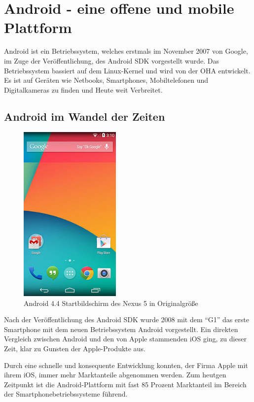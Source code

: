 \section{Android - eine offene und mobile Plattform}
Android ist ein Betriebssystem, welches erstmals im November 2007 von Google, im Zuge der Ver\"offentlichung, des Android \ac{SDK} vorgestellt wurde. Das Betriebssystem bassiert auf dem Linux-Kernel und wird von der \ac{OHA} entwickelt. Es ist auf Ger\"aten wie Netbooks, Smartphones, Mobiltelefonen und Digitalkameras zu finden und Heute weit Verbreitet. \cite{Kuehn12}

\subsection{Android im Wandel der Zeiten}
\begin{figure}
\vspace{-13pt}
\includegraphics[width=4.95cm]{Bilder/Android4.jpg}
\caption{Android 4.4 Startbildschirm des Nexus 5 in Originalgr\"o\ss{}e \cite{WikiAndroid}}
\label{Der MongoDB-Chooser-Dialog}
\vspace{-20pt}
\end{figure}
Nach der Ver\"offentlichung des Android \ac{SDK} wurde 2008 mit dem "`G1"' das erste Smartphone mit dem neuen Betriebssystem Android vorgestellt. Ein direkten Vergleich zwischen Android und den von Apple stammenden iOS ging, zu dieser Zeit, klar zu Gunsten der Apple-Produkte aus.
% 
 
Durch eine schnelle und konsequente Entwicklung konnten, der Firma Apple mit ihrem iOS, immer mehr Marktanteile abgenommen werden. Zum heutgen Zeitpunkt ist die Android-Plattform mit fast 85 Prozent Marktanteil im Bereich der Smartphonebetriebssysteme f\"uhrend. \cite{GolemMobileBetriebssystem}

